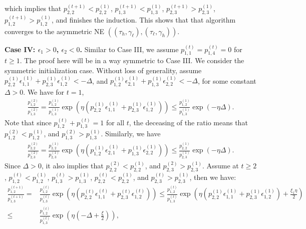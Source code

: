 which implies that $p_{2,2}^{(t+1)}< p_{2,2}^{(1)}$,  $p_{1,3}^{(t+1)}< p_{1,3}^{(1)}$,  $p_{2,3}^{(t+1)}> p_{2,3}^{(1)}$,  $p_{1,2}^{(t+1)}> p_{1,2}^{(1)}$, and finishes the induction. This shows that that algorithm converges to the asymmetric NE $((\tau_{h},\gamma_{\ell}),(\tau_{\ell},\gamma_h))$.


\noindent \textbf{Case IV: $\epsilon_1>0$, $\epsilon_2<0$.} 
Similar to Case III, we assume $p^{(t)}_{1,1}=p^{(t)}_{1,4}=0$ for $t\geq1$. The proof here will be in a way symmetric to Case III.   We  consider the symmetric initialization case. Without loss of generality, assume $p^{(1)}_{2,2}\epsilon^{(1)}_{1,1}+p^{(1)}_{2,3}\epsilon^{(1)}_{1,2}<-\Delta$, and $p^{(1)}_{1,2}\epsilon^{(1)}_{2,1}+p^{(1)}_{1,3}\epsilon^{(1)}_{2,2}<-\Delta$, for some constant $\Delta>0$. We have for $t=1$, 
\begin{equation*}
    \begin{split}
\frac{p^{(2)}_{1,2}}{p^{(2)}_{1,3}} = \frac{p^{(1)}_{1,2}}{p^{(1)}_{1,3}}\exp\left(\eta\left(p^{(1)}_{2,2}\epsilon^{(1)}_{1,1} + p^{(1)}_{2,3}\epsilon^{(1)}_{1,2}\right)\right)\leq    \frac{p^{(1)}_{1,2}}{p^{(1)}_{1,3}}\exp(-\eta\Delta). 
    \end{split}
\end{equation*}
Note that since $p^{(t)}_{1,2}+p^{(t)}_{1,3}=1$ for all $t$, the deceasing of the ratio means that $p^{(2)}_{1,2}< p^{(1)}_{1,2}$, and $p^{(2)}_{1,3}> p^{(1)}_{1,3}$. Similarly, we have
\begin{equation*}
    \begin{split}
\frac{p^{(2)}_{2,2}}{p^{(2)}_{2,3}} = \frac{p^{(1)}_{2,2}}{p^{(1)}_{2,3}}\exp\left(\eta\left(p^{(1)}_{1,2}\epsilon^{(1)}_{2,1} + p^{(1)}_{1,3}\epsilon^{(1)}_{2,2}\right)\right) \leq   \frac{p^{(1)}_{2,2}}{p^{(1)}_{2,3}}\exp(-\eta \Delta). 
    \end{split}
\end{equation*}
Since $\Delta>0$, it also implies that $p^{(2)}_{2,2}<p^{(1)}_{2,2}$, and $p^{(2)}_{2,3}>p^{(1)}_{2,3}$. Assume at $t\geq 2$, $p^{(t)}_{1,2}< p^{(1)}_{1,2}$,  $p^{(t)}_{1,3}> p^{(1)}_{1,3}$, $p^{(t)}_{2,2}<p^{(1)}_{2,2}$, and $p^{(t)}_{2,3}>p^{(1)}_{2,3}$, then we have:
\begin{equation*}
    \begin{split}
        \frac{p^{(t+1)}_{1,2}}{p^{(t+1)}_{1,3}} = {} & \frac{p^{(t)}_{1,2}}{p^{(t)}_{1,3}}\exp\left(\eta\left(p^{(t)}_{2,2}\epsilon^{(t)}_{1,1} + p^{(t)}_{2,3}\epsilon^{(t)}_{1,2}\right)\right) \leq \frac{p^{(t)}_{1,2}}{p^{(t)}_{1,3}}\exp\left(\eta\left(p^{(1)}_{2,2}\epsilon^{(1)}_{1,1} + p^{(1)}_{2,3}\epsilon^{(1)}_{1,2}\right)+\frac{\xi_1\eta}{2}\right)
        \\
        \leq {} & \frac{p^{(t)}_{1,2}}{p^{(t)}_{1,3}}\exp\left(\eta\left(-\Delta+\frac{\xi}{2}\right)\right),  
    \end{split}
\end{equation*}
